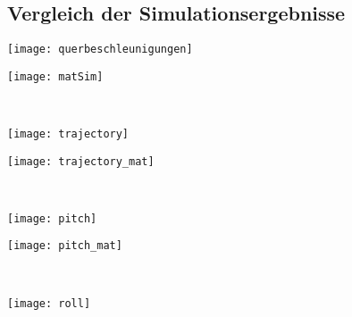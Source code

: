 \appendix 
\chapter{}
\section{Vergleich der Simulationsergebnisse}
\label{sec:simerg}
 \begin{minipage}{0.49\linewidth} 	
	\texttt{[image: querbeschleunigungen]}
\end{minipage}
\begin{minipage}{0.01\linewidth}
	\hfill
\end{minipage}
\begin{minipage}{0.49\linewidth}
	\texttt{[image: matSim]}
\end{minipage}
\noindent\\
%
%
 \begin{minipage}{0.49\linewidth} 	
	\texttt{[image: trajectory]}
\end{minipage}
\begin{minipage}{0.01\linewidth}
	\hfill
\end{minipage}
\begin{minipage}{0.49\linewidth}
	\texttt{[image: trajectory\_mat]}
\end{minipage}
\noindent\\
%
%
 \begin{minipage}{0.49\linewidth} 	
	\texttt{[image: pitch]}
\end{minipage}
\begin{minipage}{0.01\linewidth}
	\hfill
\end{minipage}
\begin{minipage}{0.49\linewidth}
	\texttt{[image: pitch\_mat]}
\end{minipage}
\noindent\\
%
%
\begin{minipage}{0.49\linewidth} 	
	\texttt{[image: roll]}
\end{minipage}
\begin{minipage}{0.01\linewidth}
	\hfill
\end{minipage}
